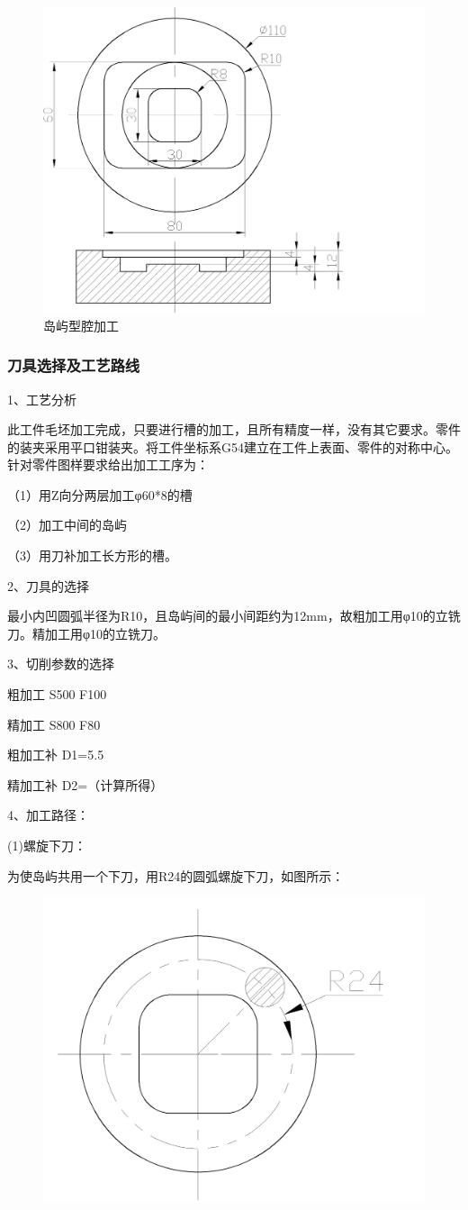 \begin{figure}[h]
	\centering
	\includegraphics[width=0.8\linewidth,trim=0 0 150  0,clip]{data/image/19-1.jpg}
	\caption{岛屿型腔加工}
	\label{fig:19-1}
\end{figure}

\subsubsection{刀具选择及工艺路线}
1、工艺分析

此工件毛坯加工完成，只要进行槽的加工，且所有精度一样，没有其它要求。零件的装夹采用平口钳装夹。将工件坐标系G54建立在工件上表面、零件的对称中心。针对零件图样要求给出加工工序为：

（1）用Z向分两层加工φ60*8的槽

（2）加工中间的岛屿

（3）用刀补加工长方形的槽。

2、刀具的选择

最小内凹圆弧半径为R10，且岛屿间的最小间距约为12mm，故粗加工用φ10的立铣刀。精加工用φ10的立铣刀。

3、切削参数的选择

粗加工   S500   F100

精加工   S800   F80

粗加工补 D1=5.5

精加工补 D2=（计算所得）

4、加工路径：

(1)螺旋下刀：

为使岛屿共用一个下刀，用R24的圆弧螺旋下刀，如图所示：

\begin{figure}[h]
    \centering
    \includegraphics[width=0.6\linewidth,trim=0 0 120  0,clip]{data/image/19-2.jpg}
    \caption{}
    \label{fig:19-2}
\end{figure}


